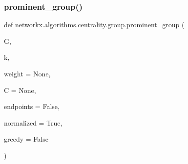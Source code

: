 \subsubsection{\texorpdfstring{prominent\+\_\+group()}{prominent\_group()}}
{\footnotesize\ttfamily def networkx.\+algorithms.\+centrality.\+group.\+prominent\+\_\+group (\begin{DoxyParamCaption}\item[{}]{G,  }\item[{}]{k,  }\item[{}]{weight = {\ttfamily None},  }\item[{}]{C = {\ttfamily None},  }\item[{}]{endpoints = {\ttfamily False},  }\item[{}]{normalized = {\ttfamily True},  }\item[{}]{greedy = {\ttfamily False} }\end{DoxyParamCaption})}

